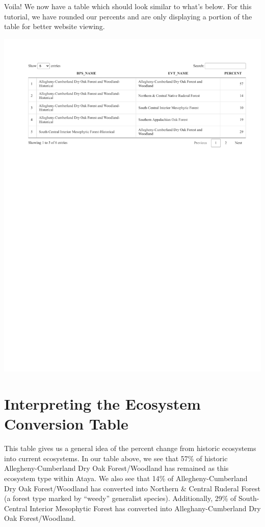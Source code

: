 \documentclass[
]{book}
\begin{document}
Voila! We now have a table which should look similar to what's below. For this tutorial, we have rounded our percents and are only displaying a portion of the table for better website viewing.

\includegraphics{FSCBook_files/figure-latex/bps2evtDT-1.pdf}

\hypertarget{interpreting-the-ecosystem-conversion-table}{%
\section{Interpreting the Ecosystem Conversion Table}\label{interpreting-the-ecosystem-conversion-table}}

This table gives us a general idea of the percent change from historic ecosystems into current ecosystems. In our table above, we see that 57\% of historic Allegheny-Cumberland Dry Oak Forest/Woodland has remained as this ecosystem type within Ataya. We also see that 14\% of Allegheny-Cumberland Dry Oak Forest/Woodland has converted into Northern \& Central Ruderal Forest (a forest type marked by ``weedy'' generalist species). Additionally, 29\% of South-Central Interior Mesophytic Forest has converted into Alleghany-Cumberland Dry Oak Forest/Woodland.
\end{document}
